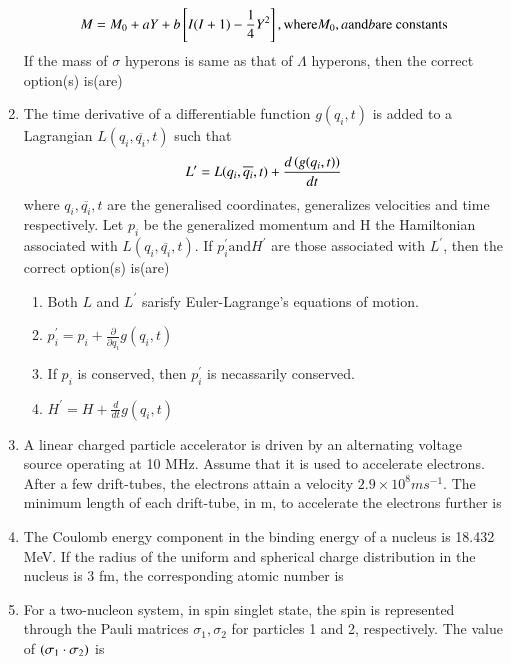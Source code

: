 \documentclass[journal]{IEEEtran}
\begin{document}
\begin{enumerate}
		$$ M = M_0 + aY + b {}\left[I(I+1) - \frac{1}{4} Y^2\right], \text{where} M_0, a \text{and} b \text{are constants}$$
		If the mass of $\sigma$ hyperons is same as that of $\Lambda$ hyperons, then the correct option(s) is(are)
		\begin{enumerate}
		\end{enumerate}
	\item The time derivative of a differentiable function $g(q_{i},t)$ is added to a Lagrangian $L(q_i, \overline{q_i},t)$ such that
		$$ L^{\prime} = L(q_i, \overline{q_i}, t) + \frac{d\left(g(q_i,t)\right)}{dt} $$
		where $q_i, \overline{q_i}, t$ are the generalised coordinates, generalizes velocities and time respectively. Let $p_i$ be the generalized momentum and H the Hamiltonian associated with $L(q_i, \overline{q_i}, t)$. If $p_{i}^{\prime} \text{and} H^{\prime}$ are those associated with $L^{\prime}$, then the correct option(s) is(are)
		\begin{enumerate}
			\item Both $L$ and $L^{\prime}$ sarisfy Euler-Lagrange's equations of motion.
			\item $p_{i}^{\prime} = p_i + \frac{\partial}{\partial q_i} g(q_i,t) $
			\item If $p_i$ is conserved, then $p_{i}^{\prime}$ is necassarily conserved.
			\item $H^{\prime} = H + \frac{d}{dt} g(q_i, t) $
		\end{enumerate}
	\item A linear charged particle accelerator is driven by an alternating voltage source operating at 10 MHz. Assume that it is used to accelerate electrons. After a few drift-tubes, the electrons attain a velocity $2.9 \times 10^8 ms^{-1}$. The minimum length of each drift-tube, in m, to accelerate the electrons further is \underline{   }
	\item The Coulomb energy component in the binding energy of a nucleus is 18.432 MeV. If the radius of the uniform and spherical charge distribution in the nucleus is 3 fm, the corresponding atomic number is \underline{  }
	\item For a two-nucleon system, in spin singlet state, the spin is represented through the Pauli matrices $\sigma_1, \sigma_2$ for particles 1 and 2, respectively. The value of $\left(\sigma_1 \cdot \sigma_2\right)$ is

\end{enumerate}
\end{document}
